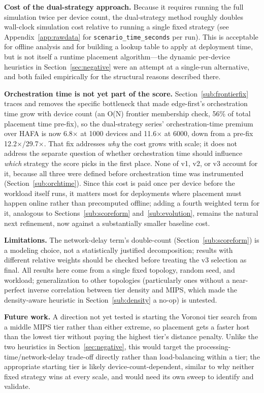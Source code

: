 \documentclass[10pt,conference]{IEEEtran}
\begin{document}
\textbf{Cost of the dual-strategy approach.} Because it requires running the full simulation twice per device count, the dual-strategy method roughly doubles wall-clock simulation cost relative to running a single fixed strategy (see Appendix~\ref{app:rawdata} for \texttt{scenario\_time\_seconds} per run). This is acceptable for offline analysis and for building a lookup table to apply at deployment time, but is not itself a runtime placement algorithm---the dynamic per-device heuristics in Section~\ref{sec:negative} were an attempt at a single-run alternative, and both failed empirically for the structural reasons described there.

\textbf{Orchestration time is not yet part of the score.} Section~\ref{sub:frontierfix} traces and removes the specific bottleneck that made edge-first's orchestration time grow with device count (an O(N) frontier membership check, 56\% of total placement time pre-fix), so the dual-strategy series' orchestration-time premium over HAFA is now 6.8$\times$ at 1000 devices and 11.6$\times$ at 6000, down from a pre-fix 12.2$\times$/29.7$\times$. That fix addresses \emph{why} the cost grows with scale; it does not address the separate question of whether orchestration time should influence \emph{which} strategy the score picks in the first place. None of v1, v2, or v3 account for it, because all three were defined before orchestration time was instrumented (Section~\ref{sub:orchtime}). Since this cost is paid once per device before the workload itself runs, it matters most for deployments where placement must happen online rather than precomputed offline; adding a fourth weighted term for it, analogous to Sections~\ref{sub:scoreform} and~\ref{sub:evolution}, remains the natural next refinement, now against a substantially smaller baseline cost.

\textbf{Limitations.} The network-delay term's double-count (Section~\ref{sub:scoreform}) is a modeling choice, not a statistically justified decomposition; results with different relative weights should be checked before treating the v3 selection as final. All results here come from a single fixed topology, random seed, and workload; generalization to other topologies (particularly ones without a near-perfect inverse correlation between tier density and MIPS, which made the density-aware heuristic in Section~\ref{sub:density} a no-op) is untested.

\textbf{Future work.} A direction not yet tested is starting the Voronoi tier search from a middle MIPS tier rather than either extreme, so placement gets a faster host than the lowest tier without paying the highest tier's distance penalty. Unlike the two heuristics in Section~\ref{sec:negative}, this would target the processing-time/network-delay trade-off directly rather than load-balancing within a tier; the appropriate starting tier is likely device-count-dependent, similar to why neither fixed strategy wins at every scale, and would need its own sweep to identify and validate.
\end{document}

